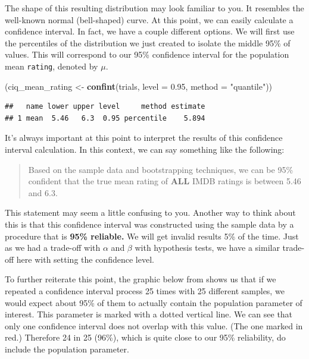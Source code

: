 \documentclass[]{tufte-book}
\newenvironment{Shaded}{\begin{snugshade}}{\end{snugshade}}
\newcommand{\KeywordTok}[1]{\textcolor[rgb]{0.13,0.29,0.53}{\textbf{{#1}}}}
\newcommand{\DataTypeTok}[1]{\textcolor[rgb]{0.13,0.29,0.53}{{#1}}}
\newcommand{\FloatTok}[1]{\textcolor[rgb]{0.00,0.00,0.81}{{#1}}}
\newcommand{\StringTok}[1]{\textcolor[rgb]{0.31,0.60,0.02}{{#1}}}
\newcommand{\NormalTok}[1]{{#1}}
\theoremstyle{definition}
\theoremstyle{definition}
\theoremstyle{remark}
\begin{document}
The shape of this resulting distribution may look familiar to you. It
resembles the well-known normal (bell-shaped) curve. At this point, we
can easily calculate a confidence interval. In fact, we have a couple
different options. We will first use the percentiles of the distribution
we just created to isolate the middle 95\% of values. This will
correspond to our 95\% confidence interval for the population mean
\texttt{rating}, denoted by \(\mu\).

\begin{Shaded}
\begin{Highlighting}[]
\NormalTok{(ciq_mean_rating <-}\StringTok{ }\KeywordTok{confint}\NormalTok{(trials, }\DataTypeTok{level =} \FloatTok{0.95}\NormalTok{, }\DataTypeTok{method =} \StringTok{"quantile"}\NormalTok{))}
\end{Highlighting}
\end{Shaded}

\begin{verbatim}
##   name lower upper level     method estimate
## 1 mean  5.46   6.3  0.95 percentile    5.894
\end{verbatim}

It's always important at this point to interpret the results of this
confidence interval calculation. In this context, we can say something
like the following:

\begin{quote}
Based on the sample data and bootstrapping techniques, we can be 95\%
confident that the true mean rating of \textbf{ALL} IMDB ratings is
between 5.46 and 6.3.
\end{quote}

This statement may seem a little confusing to you. Another way to think
about this is that this confidence interval was constructed using the
sample data by a procedure that is \textbf{95\% reliable.} We will get
invalid results 5\% of the time. Just as we had a trade-off with
\(\alpha\) and \(\beta\) with hypothesis tests, we have a similar
trade-off here with setting the confidence level.

To further reiterate this point, the graphic below from \citet{isrs2014}
shows us that if we repeated a confidence interval process 25 times with
25 different samples, we would expect about 95\% of them to actually
contain the population parameter of interest. This parameter is marked
with a dotted vertical line. We can see that only one confidence
interval does not overlap with this value. (The one marked in red.)
Therefore 24 in 25 (96\%), which is quite close to our 95\% reliability,
do include the population parameter.
\end{document}
